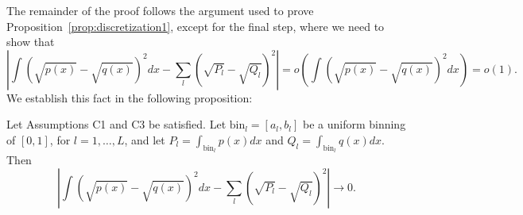 \documentclass{article}
\newcommand{\bin}{\text{bin}}
\begin{document}

The remainder of the proof follows the argument used to prove Proposition~\ref{prop:discretization1}, except for the final step, where we need to show that
$$\left| \int (\sqrt{p(x)} - \sqrt{q(x)})^2 dx - \sum_l (\sqrt{P_l} - \sqrt{Q_l})^2 \right| = o(\int (\sqrt{p(x)} - \sqrt{q(x)})^2 dx) = o(1).$$
We establish this fact in the following proposition:



\begin{proposition}
\label{prop:H_HL_convergence2}
Let Assumptions C1 and C3 be satisfied. Let $\bin_l = [a_l, b_l]$ be a uniform binning of $[0,1]$, for $l=1, \dots, L$, and let $P_l = \int_{\bin_l} p(x) dx$ and $Q_l = \int_{\bin_l} q(x) dx$. Then
\[
\left| \int (\sqrt{p(x)} - \sqrt{q(x)})^2 dx - \sum_l (\sqrt{P_l} - \sqrt{Q_l})^2 \right| \rightarrow 0.
\]
\end{proposition}
\end{document}
